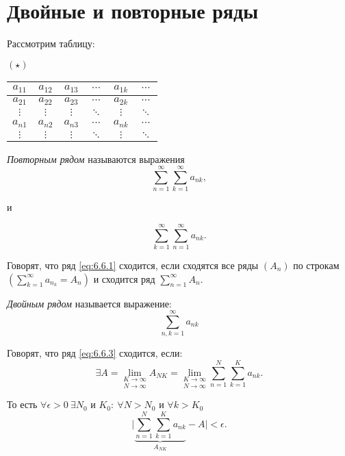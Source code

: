 

\section{Двойные и повторные ряды}

\begin{note}
    Рассмотрим таблицу:
    \begin{center}
        $(\star) \quad$ \begin{tabular}{c | c | c | c | c | c}
            $a_{11}$ & $a_{12}$ & $a_{13}$ & $\cdots$ & $a_{1k}$ & $\cdots$ \\
            \hline
            $a_{21}$ & $a_{22}$ & $a_{23}$ & $\cdots$ & $a_{2k}$ & $\cdots$ \\
            \hline
            $\vdots$ & $\vdots$ & $\vdots$ & $\ddots$ & $\vdots$ & $\ddots$ \\
            \hline
            $a_{n1}$ & $a_{n2}$ & $a_{n3}$ & $\cdots$ & $a_{nk}$ & $\cdots$ \\
            \hline
            $\vdots$ & $\vdots$ & $\vdots$ & $\ddots$ & $\vdots$ & $\ddots$ \\
        \end{tabular}
    \end{center}
\end{note}

\begin{definition}
    \emph{Повторным рядом} называются выражения
    \begin{equation}\label{eq:6.6.1}
        \sum_{n=1}^{\infty}\sum_{k=1}^{\infty}a_{nk},
    \end{equation}
    \begin{center}
        и
    \end{center}
    \begin{equation}\label{eq:6.6.2}
        \sum_{k=1}^{\infty}\sum_{n=1}^{\infty}a_{nk}.
    \end{equation}

    Говорят, что ряд \ref{eq:6.6.1} сходится, если сходятся все ряды $(A_n)$ по строкам $(\sum_{k=1}^{\infty}a_{n_k} = A_n)$ и сходится ряд $ \sum_{n=1}^{\infty}A_n $.
\end{definition}

\begin{definition}
    \emph{Двойным рядом} называется выражение:
    \begin{equation}\label{eq:6.6.3}
        \sum_{n,k = 1}^{\infty} a_{nk}
    \end{equation}

    Говорят, что ряд \ref{eq:6.6.3} сходится, если:
    \[
        \exists A = \underset{N\rightarrow\infty}{\underset{K\rightarrow\infty}{\lim}}A_{NK} = \underset{N\rightarrow\infty}{\underset{K\rightarrow\infty}{\lim}}\sum_{n=1}^{N}\sum_{k=1}^{K}a_{nk}.
    \]

    То есть $\forall \epsilon > 0 \ \exists N_0$ и $K_0: \ \forall N > N_0$ и $\forall k > K_0$
    \[
        \bigg|\underbrace{\sum_{n=1}^{N}\sum_{k=1}^{K}a_{nk}}_{A_{NK}} - A\bigg| < \epsilon.
    \]
\end{definition}

